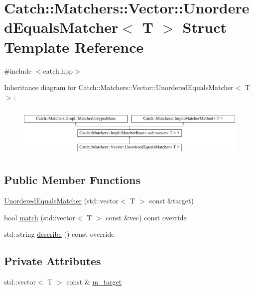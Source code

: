 \hypertarget{struct_catch_1_1_matchers_1_1_vector_1_1_unordered_equals_matcher}{}\section{Catch\+::Matchers\+::Vector\+::Unordered\+Equals\+Matcher$<$ T $>$ Struct Template Reference}
\label{struct_catch_1_1_matchers_1_1_vector_1_1_unordered_equals_matcher}


{\ttfamily \#include $<$catch.\+hpp$>$}

Inheritance diagram for Catch\+::Matchers\+::Vector\+::Unordered\+Equals\+Matcher$<$ T $>$\+:\begin{figure}[H]
\begin{center}
\leavevmode
\includegraphics[height=2.492581cm]{struct_catch_1_1_matchers_1_1_vector_1_1_unordered_equals_matcher}
\end{center}
\end{figure}
\subsection*{Public Member Functions}
\begin{DoxyCompactItemize}
\item 
\mbox{\hyperlink{struct_catch_1_1_matchers_1_1_vector_1_1_unordered_equals_matcher_a525905639b2b15b52ddb0bf14bfa19da}{Unordered\+Equals\+Matcher}} (std\+::vector$<$ T $>$ const \&target)
\item 
bool \mbox{\hyperlink{struct_catch_1_1_matchers_1_1_vector_1_1_unordered_equals_matcher_a3ccdd9dd2cd8bdbb8bb121acbb9cb358}{match}} (std\+::vector$<$ T $>$ const \&vec) const override
\item 
std\+::string \mbox{\hyperlink{struct_catch_1_1_matchers_1_1_vector_1_1_unordered_equals_matcher_a7202d811200317abc58c844f663823df}{describe}} () const override
\end{DoxyCompactItemize}
\subsection*{Private Attributes}
\begin{DoxyCompactItemize}
\item 
std\+::vector$<$ T $>$ const  \& \mbox{\hyperlink{struct_catch_1_1_matchers_1_1_vector_1_1_unordered_equals_matcher_aaa39871eb4034d4335214215dd693712}{m\+\_\+target}}
\end{DoxyCompactItemize}
